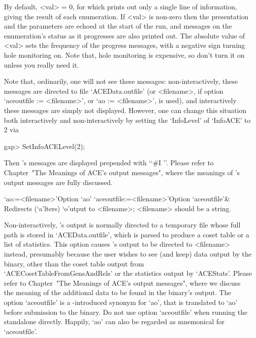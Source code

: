 By default, <val> = 0, for which {\ACE} prints out only a single  line
of information, giving the result of each  enumeration.  If  <val>  is
non-zero then the presentation and the parameters are  echoed  at  the
start of the run, and messages  on  the  enumeration's  status  as  it
progresses are also printed out. The absolute value of <val> sets  the
frequency of the progress messages, with a negative sign turning  hole
monitoring on. Note that, hole monitoring is expensive, so don't  turn
it on unless you really need it.

Note   that,  ordinarily,  one   will   not   see   these    messages:
non-interactively,   these   messages    are    directed    to    file
`ACEData.outfile'   (or   <filename>,   if   option   `aceoutfile   :=
<filename>', or `ao := <filename>', is used), and interactively  these
messages are simply  not  displayed.  However,  one  can  change  this
situation both interactively and   non-interactively  by  setting  the
`InfoLevel' of `InfoACE' to 2 via

\begintt
gap> SetInfoACELevel(2);
\endtt

Then {\ACE}'s messages are  displayed  prepended  with  \lq{}`\#I  ''.
Please refer to Chapter~"The Meanings of ACE's output messages", where
the meanings of {\ACE}'s output messages are fully discussed.

\>`ao:=<filename>'{Option `ao'}
\>`aceoutfile:=<filename>'{Option `aceoutfile'}&
Redirects (`a'lters) `o'utput to <filename>; <filename>  should  be  a
string.

Non-interactively, {\ACE}'s output is normally directed to a temporary
file whose full path is stored in `ACEData.outfile', which  is  parsed
to produce a coset table or a list of statistics. This  option  causes
{\ACE}'s output to  be  directed  to  <filename>  instead,  presumably
because the user wishes to see (and keep) data output  by  the  {\ACE}
binary,    other    than    the    coset     table     output     from
`ACECosetTableFromGensAndRels' or the statistics output by `ACEStats'.
Please refer to Chapter~"The Meanings of ACE's output messages", where
we discuss the meaning of the additional  data  to  be  found  in  the
{\ACE} binary's output. The option `aceoutfile' is a {\GAP}-introduced
synonym for `ao', that is translated to `ao' before submission to  the
{\ACE} binary.  Do  not  use  option  `aceoutfile'  when  running  the
standalone directly. Happily, `ao' can also be regarded as  mnemonical
for `aceoutfile'.

\enditems

